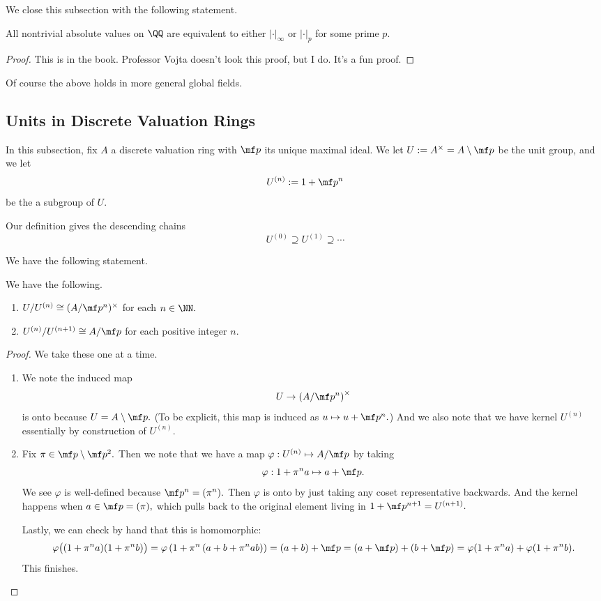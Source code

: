 \documentclass[../notes.tex]{subfiles}
\begin{document}
We close this subsection with the following statement.
\begin{theorem}
	All nontrivial absolute values on $\QQ$ are equivalent to either $|\cdot|_\infty$ or $|\cdot|_p$ for some prime $p.$
\end{theorem}
\begin{proof}
	This is in the book. Professor Vojta doesn't look this proof, but I do. It's a fun proof.
\end{proof}
\begin{remark}[Nir]
	Of course the above holds in more general global fields.
\end{remark}

\subsection{Units in Discrete Valuation Rings}
In this subsection, fix $A$ a discrete valuation ring with $\mf p$ its unique maximal ideal. We let $U:=A^\times=A\setminus\mf p$ be the unit group, and we let
\[U^{(n)}:=1+\mf p^n\]
be the a subgroup of $U.$
\begin{remark}
	Our definition gives the descending chains
	\[U^{(0)}\supseteq U^{(1)}\supseteq\cdots\]
\end{remark}

We have the following statement.
\begin{proposition}
	We have the following.
	\begin{enumerate}[label=(\alph*)]
		\item $U/U^{(n)}\cong(A/\mf p^n)^\times$ for each $n\in\NN.$
		\item $U^{(n)}/U^{(n+1)}\cong A/\mf p$ for each positive integer $n.$
	\end{enumerate}
\end{proposition}
\begin{proof}
	We take these one at a time.
	\begin{enumerate}
		\item We note the induced map
		\[U\to \left(A/\mf p^n\right)^\times\]
		is onto because $U=A\setminus\mf p.$ (To be explicit, this map is induced as $u\mapsto u+\mf p^n.$) And we also note that we have kernel $U^{(n)}$ essentially by construction of $U^{(n)}.$
		\item Fix $\pi\in\mf p\setminus\mf p^2.$ Then we note that we have a map $\varphi:U^{(n)}\mapsto A/\mf p$ by taking
		\[\varphi:1+\pi^na\mapsto a+\mf p.\]
		We see $\varphi$ is well-defined because $\mf p^n=(\pi^n).$ Then $\varphi$ is onto by just taking any coset representative backwards. And the kernel happens when $a\in\mf p=(\pi),$ which pulls back to the original element living in $1+\mf p^{n+1}=U^{(n+1)}.$
		
		Lastly, we can check by hand that this is homomorphic:
		\[\varphi\big((1+\pi^na)(1+\pi^nb)\big)=\varphi\left(1+\pi^n\left(a+b+\pi^nab\right)\right)=(a+b)+\mf p=(a+\mf p)+(b+\mf p)=\varphi(1+\pi^na)+\varphi(1+\pi^nb).\]
		This finishes.
		\qedhere
	\end{enumerate}
\end{proof}
\end{document}
